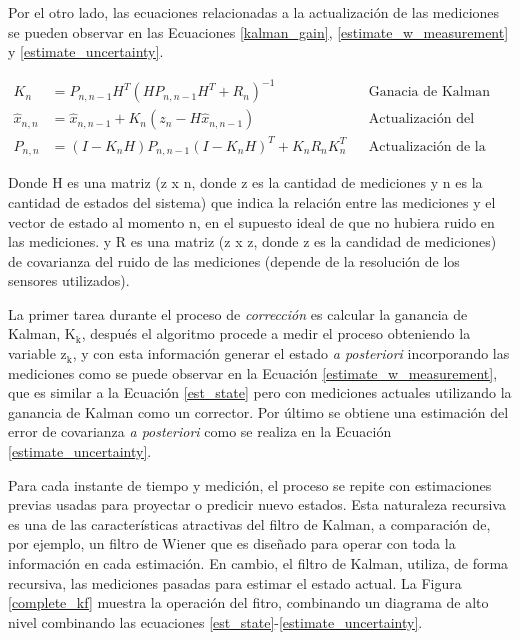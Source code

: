 \documentclass[10pt,a4paper]{article}
\begin{document}
\noindent Por el otro lado, las ecuaciones relacionadas a la actualizaci\'on de 
las mediciones se pueden observar en las Ecuaciones \ref{kalman_gain},
\ref{estimate_w_measurement} y \ref{estimate_uncertainty}.

\begin{align}
    K_n &= P_{n, n-1}H^T(HP_{n,n-1}H^T + R_n)^{-1} & & \textrm{Ganacia de Kalman}
    \label{kalman_gain}\\
    \hat{x}_{n, n} &= \hat{x}_{n,n-1} + K_n \left(z_n - H\hat{x}_{n, n-1}\right) & & \textrm{Actualizaci\'on del estado}
    \label{estimate_w_measurement}\\
    P_{n, n} &= \left(I - K_nH\right)P_{n,n-1}\left(I - K_nH\right)^T + K_n R_{n} K_n^T & & \textrm{Actualizaci\'on de la covarianza}
    \label{estimate_uncertainty}
\end{align}
\FloatBarrier

\noindent Donde H es una matriz (z x n, donde z es la cantidad de mediciones y n
es la cantidad de estados del sistema) que indica la relación entre las
mediciones y el vector de estado al momento n, en el supuesto ideal de que no
hubiera ruido en las mediciones. y R es una matriz (z x z, donde z es la
candidad de mediciones) de covarianza del ruido de las mediciones (depende de la
resolución de los sensores utilizados).

\noindent La primer tarea durante el proceso de \emph{correcci\'on} es calcular 
la ganancia de Kalman, $\mathrm{K_k}$, despu\'es el algoritmo procede a medir el
proceso obteniendo la variable $\mathrm{z_k}$, y con esta informaci\'on generar
el estado \emph{a posteriori} incorporando las mediciones como se puede observar
en la Ecuaci\'on \ref{estimate_w_measurement}, que es similar a la Ecuaci\'on
\ref{est_state} pero con mediciones actuales utilizando la ganancia de Kalman
como un corrector. Por \'ultimo se obtiene una estimaci\'on del error de
covarianza \emph{a posteriori} como se realiza en la Ecuaci\'on
\ref{estimate_uncertainty}. 

\noindent Para cada instante de tiempo y medici\'on, el proceso se repite con 
estimaciones previas usadas para proyectar o predicir nuevo estados. Esta 
naturaleza recursiva es una de las caracter\'isticas atractivas del filtro de 
Kalman, a comparaci\'on de, por ejemplo, un filtro de Wiener \cite{brown_hwang} 
que es diseñado para operar con toda la informaci\'on en cada estimaci\'on. 
En cambio, el filtro de Kalman, utiliza, de forma recursiva, las mediciones 
pasadas para estimar el estado actual. La Figura \ref{complete_kf} muestra la 
operaci\'on del fitro, combinando un diagrama de alto nivel combinando las 
ecuaciones \ref{est_state}-\ref{estimate_uncertainty}.
\end{document}
